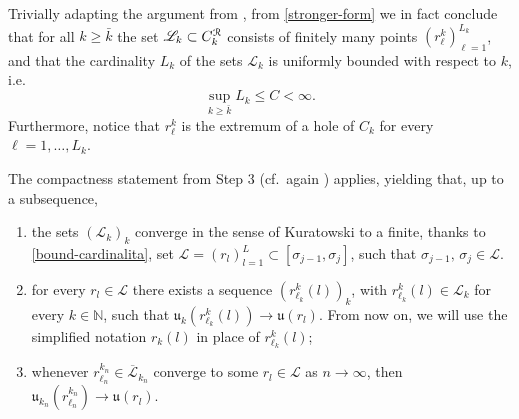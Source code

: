 \documentclass[a4paper,10pt,reqno]{amsart} %
\newcommand{\N}{\mathbb{N}}
\numberwithin{equation}{section}
\newcommand{\hole}[1]{\mathfrak{h}(#1)}
\newcommand{\invcur}[1]{\mathfrak{u}_{#1}}
\newcommand{\invcu}{\mathfrak{u}}
\newcommand{\EEE}{\color{black}}
\begin{document}
Trivially adapting the  argument from \cite[Rmk.\ 3.15]{SavMin16},  from \eqref{stronger-form} we  in fact conclude that 
 for all $k\geq\bar{k}$ the set  $  \mathscr{L}_k \subset C_{k}^{{\mathcal R}}$  consists of finitely many points 
$ (r_{\ell}^k)_{\ell=1}^{L_k}$, and 
 that the cardinality $L_k $ of the sets  $\mathscr{L}_k$ is uniformly bounded with respect to $k$, i.e.
\begin{equation}
\label{bound-cardinalita}
\sup_{k \geq \bar{k}} L_k \leq C<\infty.
\end{equation}
Furthermore, notice that 
 $r_\ell^k$  is the extremum of a hole of $C_k$ for every $\ell =1, \ldots, L_k$. 
\par\noindent The compactness statement from Step $3$ (cf.\ again \cite[Thm.\ 5.4]{SavMin16}) applies, yielding that, up to a subsequence,
 \begin{enumerate}
\item
 the sets $   ({\mathscr{L}}_k)_k $ converge in the sense of Kuratowski to a %
  finite, thanks to \eqref{bound-cardinalita}, 
 set $\mathscr{L} = (r_l)_{l=1}^L  \subset [\sigma_{j-1},\sigma_j]$,  such that 
 $\sigma_{j-1},\, \sigma_j \in \mathscr{L}$. 
 \item
 for every $r_l \in \mathscr{L}$ there exists a sequence $
 (r_{\ell_k}^k(l))_k$, with $r_{\ell_k}^k(l) \in {\mathscr{L}}_k $ for every $k\in \N$, such that 
 $\invcur k (r_{\ell_k}^k(l)) \to \invcu (r_l)$. From now on, we will use the simplified notation $r_k(l)$ in place of $r_{\ell_k}^k(l)$;
 \item
  whenever $  r_{{\ell_n}}^{k_n} \in \overline{\mathscr{L}}_{k_n}$ converge to some $r_{l} \in \mathscr{L}$ as $n\to\infty$, then 
$\invcur {k_n} ( r_{{\ell_n}}^{k_n}) \to \invcu (r_l)$. 
\end{enumerate}
\end{document}
